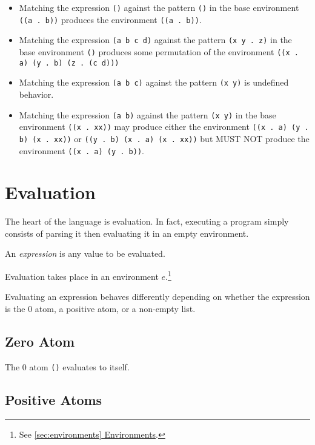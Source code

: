 \documentclass[twocolumn]{report}
\newcommand{\intralink}[2]{\hyperref[#1]{\ref*{#1} #2}}
\begin{document}
\begin{itemize}
\item Matching the expression \texttt{()} against the pattern \texttt{()} in the base environment \texttt{((a . b))} produces the environment \texttt{((a . b))}.
\item Matching the expression \texttt{(a b c d)} against the pattern \texttt{(x y . z)} in the base environment \texttt{()} produces some permutation of the environment \texttt{((x . a) (y . b) (z . (c d)))}
\item Matching the expression \texttt{(a b c)} against the pattern \texttt{(x y)} is undefined behavior.
\item Matching the expression \texttt{(a b)} against the pattern \texttt{(x y)} in the base environment \texttt{((x . xx))} may produce either the environment \texttt{((x . a) (y . b) (x . xx))} or \texttt{((y . b) (x . a) (x . xx))} but MUST NOT produce the environment \texttt{((x . a) (y . b))}.
\end{itemize}

\section{Evaluation}
\label{sec:evaluation}

The heart of the language is evaluation.
In fact, executing a program simply consists of parsing it then evaluating it in an empty environment.

An \emph{expression} is any value to be evaluated.

Evaluation takes place in an environment $e$.\footnote{See \intralink{sec:environments}{Environments}.}

Evaluating an expression behaves differently depending on whether the expression is the $0$ atom, a positive atom, or a non-empty list.

\subsection{Zero Atom}
\label{sec:eval_zero_atom}

The $0$ atom \texttt{()} evaluates to itself.

\subsection{Positive Atoms}
\label{sec:eval_positive_atom}
\end{document}
